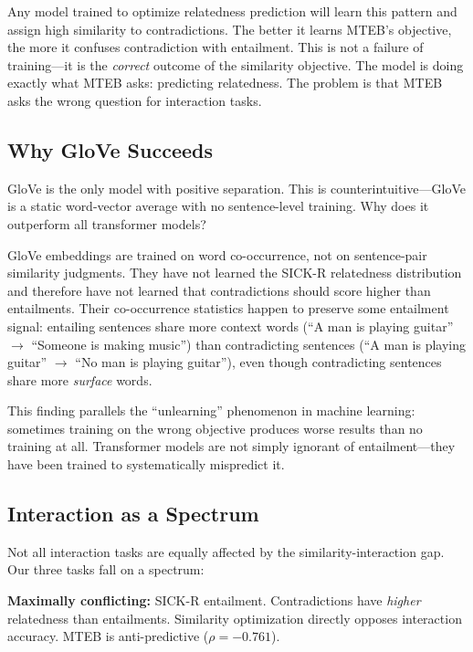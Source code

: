 \documentclass{article}
\begin{document}
Any model trained to optimize relatedness prediction will learn this pattern and assign high similarity to contradictions. The better it learns MTEB's objective, the more it confuses contradiction with entailment. This is not a failure of training---it is the \emph{correct} outcome of the similarity objective. The model is doing exactly what MTEB asks: predicting relatedness. The problem is that MTEB asks the wrong question for interaction tasks.

\subsection{Why GloVe Succeeds}

GloVe \citep{pennington2014glove} is the only model with positive separation. This is counterintuitive---GloVe is a static word-vector average with no sentence-level training. Why does it outperform all transformer models?

GloVe embeddings are trained on word co-occurrence, not on sentence-pair similarity judgments. They have not learned the SICK-R relatedness distribution and therefore have not learned that contradictions should score higher than entailments. Their co-occurrence statistics happen to preserve some entailment signal: entailing sentences share more context words (``A man is playing guitar'' $\to$ ``Someone is making music'') than contradicting sentences (``A man is playing guitar'' $\to$ ``No man is playing guitar''), even though contradicting sentences share more \emph{surface} words.

This finding parallels the ``unlearning'' phenomenon in machine learning: sometimes training on the wrong objective produces worse results than no training at all. Transformer models are not simply ignorant of entailment---they have been trained to systematically mispredict it.

\subsection{Interaction as a Spectrum}

Not all interaction tasks are equally affected by the similarity-interaction gap. Our three tasks fall on a spectrum:

\textbf{Maximally conflicting:} SICK-R entailment. Contradictions have \emph{higher} relatedness than entailments. Similarity optimization directly opposes interaction accuracy. MTEB is anti-predictive ($\rho = -0.761$).
\end{document}
